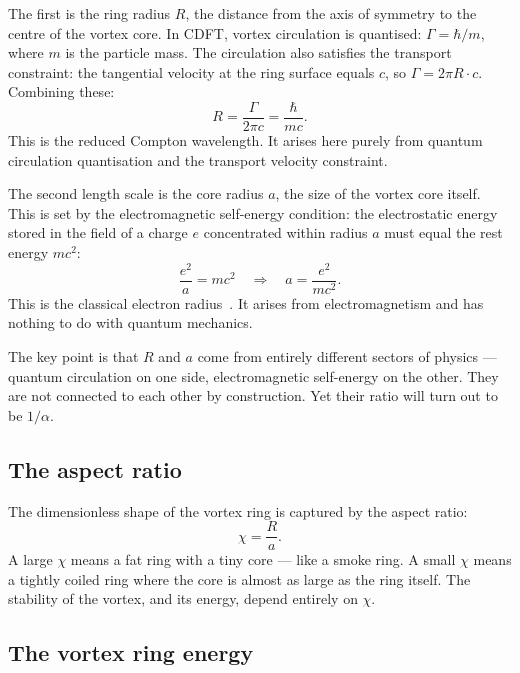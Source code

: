 \documentclass[11pt]{article}
\begin{document}
The first is the ring radius $R$, the distance from the axis of symmetry to the
centre of the vortex core. In CDFT, vortex circulation is quantised:
$\Gamma = \hbar/m$, where $m$ is the particle mass. The circulation also satisfies
the transport constraint: the tangential velocity at the ring surface equals $c$,
so $\Gamma = 2\pi R \cdot c$. Combining these:
\begin{equation}
  R = \frac{\Gamma}{2\pi c} = \frac{\hbar}{mc}.
  \label{eq:R}
\end{equation}
This is the reduced Compton wavelength. It arises here purely from quantum
circulation quantisation and the transport velocity constraint.

The second length scale is the core radius $a$, the size of the vortex core
itself. This is set by the electromagnetic self-energy condition: the electrostatic
energy stored in the field of a charge $e$ concentrated within radius $a$ must
equal the rest energy $mc^2$:
\begin{equation}
  \frac{e^2}{a} = mc^2
  \quad\Longrightarrow\quad
  a = \frac{e^2}{mc^2}.
  \label{eq:a}
\end{equation}
This is the classical electron radius~\cite{Jackson1999}. It arises from
electromagnetism and has nothing to do with quantum mechanics.

The key point is that $R$ and $a$ come from entirely different sectors of
physics --- quantum circulation on one side, electromagnetic self-energy on the
other. They are not connected to each other by construction. Yet their ratio will
turn out to be $1/\alpha$.

\subsection{The aspect ratio}

The dimensionless shape of the vortex ring is captured by the aspect ratio:
\begin{equation}
  \chi = \frac{R}{a}.
  \label{eq:chi}
\end{equation}
A large $\chi$ means a fat ring with a tiny core --- like a smoke ring. A small
$\chi$ means a tightly coiled ring where the core is almost as large as the ring
itself. The stability of the vortex, and its energy, depend entirely on $\chi$.

\subsection{The vortex ring energy}
\end{document}
